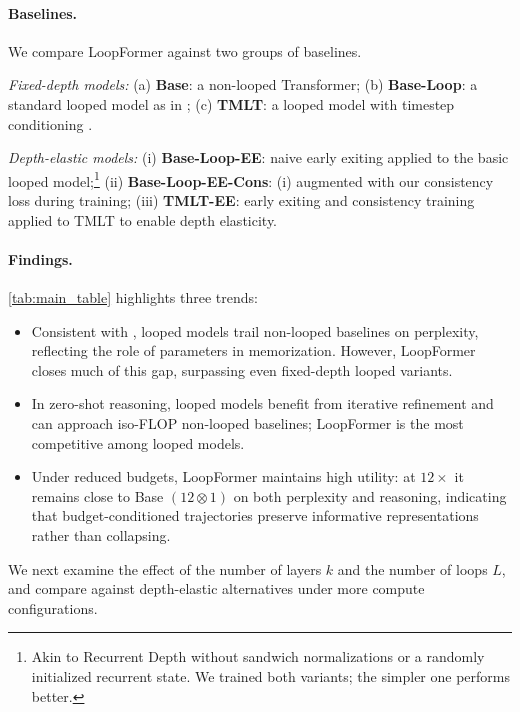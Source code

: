 \paragraph{Baselines.}
We compare LoopFormer against two groups of baselines.

\emph{Fixed-depth models:}
(a) \textbf{Base}: a non-looped Transformer;
(b) \textbf{Base-Loop}: a standard looped model as in \cite{saunshi2025reasoning};
(c) \textbf{TMLT}: a looped model with timestep conditioning \cite{xu2024expressive}.

\emph{Depth-elastic models:}
(i) \textbf{Base-Loop-EE}: naive early exiting applied to the basic looped model;\footnote{Akin to Recurrent Depth \cite{geiping2025scaling} without sandwich normalizations or a randomly initialized recurrent state. We trained both variants; the simpler one performs better.}
(ii) \textbf{Base-Loop-EE-Cons}: (i) augmented with our consistency loss during training;
(iii) \textbf{TMLT-EE}: early exiting and consistency training applied to TMLT to enable depth elasticity.


\paragraph{Findings.} \autoref{tab:main_table} highlights three trends:
\begin{itemize}[leftmargin=*,labelindent=0pt,label=\textbf{--}]
    \item Consistent with \cite{mohtashami2023cotformer, saunshi2025reasoning}, looped models trail non-looped baselines on perplexity, reflecting the role of parameters in memorization. However, LoopFormer closes much of this gap, surpassing even fixed-depth looped variants.
    \item In zero-shot reasoning, looped models benefit from iterative refinement and can approach iso-FLOP non-looped baselines; LoopFormer is the most competitive among looped models.
    \item Under reduced budgets, LoopFormer maintains high utility: at $12\times$ it remains close to Base $(12\otimes 1)$ on both perplexity and reasoning, indicating that budget-conditioned trajectories preserve informative representations rather than collapsing.
\end{itemize}

We next examine the effect of the number of layers $k$ and the number of loops $L$, and compare against depth-elastic alternatives under more compute configurations.

